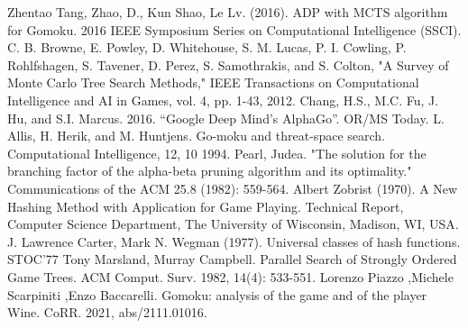 \documentclass[a4paper, 12pt]{article} %
\begin{document}
	\begin{thebibliography}{99}
		 Zhentao Tang, Zhao, D., Kun Shao, Le Lv. (2016). ADP with MCTS algorithm for Gomoku. 2016 IEEE Symposium Series on Computational Intelligence (SSCI).
		 C. B. Browne, E. Powley, D. Whitehouse, S. M. Lucas, P. I. Cowling, P. Rohlfshagen, S. Tavener, D. Perez, S. Samothrakis, and S. Colton, "A Survey of Monte Carlo Tree Search Methods," IEEE Transactions on Computational Intelligence and AI in Games, vol. 4, pp. 1-43, 2012.
		 Chang, H.S., M.C. Fu, J. Hu, and S.I. Marcus. 2016. “Google Deep Mind’s AlphaGo”. OR/MS Today.
		L. Allis, H. Herik, and M. Huntjens. Go-moku and
		threat-space search. Computational Intelligence, 12, 10 1994.
		Pearl, Judea. "The solution for the branching factor of the alpha-beta pruning algorithm and its optimality." Communications of the ACM 25.8 (1982): 559-564.
		Albert Zobrist (1970). A New Hashing Method with Application for Game Playing. Technical Report, Computer Science Department, The University of Wisconsin, Madison, WI, USA.
		J. Lawrence Carter, Mark N. Wegman (1977). Universal classes of hash functions. STOC'77
		Tony Marsland, Murray Campbell. Parallel Search of Strongly Ordered Game Trees. ACM Comput. Surv. 1982, 14(4): 533-551.
		 Lorenzo Piazzo ,Michele Scarpiniti ,Enzo Baccarelli. Gomoku: analysis of the game and of the player Wine. CoRR. 2021, abs/2111.01016. 
	\end{thebibliography}
	
	
	
\end{document}
